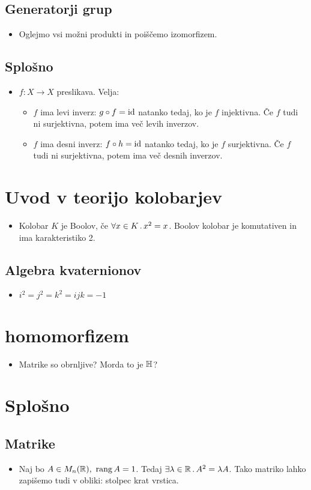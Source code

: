 \subsection{Generatorji grup}
\begin{itemize}
    \item Oglejmo vsi možni produkti in poiščemo izomorfizem.
\end{itemize}

\subsection{Splošno}
\begin{itemize}
    \item \(f: X \to X\) preslikava. Velja:
    \begin{itemize}
        \item \(f\) ima levi inverz: \(g \circ f = \operatorname{id}\) natanko tedaj, ko je \(f\) injektivna. Če \(f\) tudi ni surjektivna, potem ima več levih inverzov.
        \item \(f\) ima desni inverz: \(f \circ h = \operatorname{id}\) natanko tedaj, ko je \(f\) surjektivna. Če \(f\) tudi ni surjektivna, potem ima več desnih inverzov.
    \end{itemize}
\end{itemize}

\section{Uvod v teorijo kolobarjev}
\begin{itemize}
    \item Kolobar \(K\) je Boolov, če \(\forall x \in K \,.\,x^2 = x\). Boolov kolobar je komutativen in ima karakteristiko 2. 
\end{itemize}

\subsection{Algebra kvaternionov}
\begin{itemize}
    \item \(i^2=j^2=k^2=ijk=-1\)
\end{itemize}



\section{homomorfizem}
\begin{itemize}
    \item Matrike so obrnljive? Morda to je \(\mathbb{H}\)?
\end{itemize}

\section{Splošno}
\subsection{Matrike}
\begin{itemize}
    \item Naj bo \(A \in M_n(\mathbb{R}), \ \operatorname{rang} A = 1\). Tedaj \(\exists \lambda \in \mathbb{R} \,.\, A^2 = \lambda A\). Tako matriko lahko zapišemo tudi v obliki: stolpec krat vrstica.
\end{itemize}
